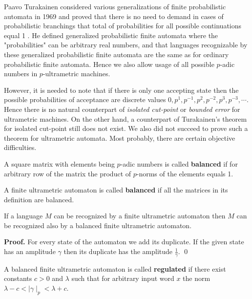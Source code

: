 \documentclass{llncs}
\begin{document}
Paavo Turakainen considered various generalizations of finite probabilistic automata in 1969 and proved that there is no need to demand in cases of probabilistic branchings that total of probabilities for all possible continuations equal 1 \cite{T69}. He defined generalized probabilistic finite automata where the "probabilities" can be arbitrary real numbers, and that languages recognizable by these generalized probabilistic finite automata are the same as for ordinary probabilistic finite automata. Hence we also allow usage of all possible $p$-adic numbers in $p$-ultrametric machines.

However, it is needed to note that if there is only one accepting state then the possible probabilities of acceptance are discrete values $0, p^1, p^{-1}, p^2, p^{-2}, p^3, p^{-3}, \cdots $. Hence there is no natural counterpart of {\em isolated cut-point} or {\em bounded error} for ultrametric machines. On the other hand, a counterpart of Turakainen's theorem for isolated cut-point still does not exist. We also did not succeed to prove such a theorem for ultrametric automata. Most probably, there are certain objective difficulties.



\begin{definition}
A square matrix with elements being $p$-adic numbers is called {\bf balanced} if for arbitrary row of the matrix the product of $p$-norms of the elements equals 1.
\end{definition}

\begin{definition}
A finite ultrametric automaton is called {\bf balanced} if all the matrices in its definition are balanced.
\end{definition}

\begin{theorem}
If a language $M$ can be recognized by a finite ultrametric automaton then $M$ can be recognized also by a balanced finite ultrametric automaton.
\end{theorem}

{\bf Proof.} For every state of the automaton we add its duplicate. If the given state has an amplitude $\gamma $ then its duplicate has the amplitude $\frac{1}{\gamma }$. \qed
 

\begin{definition}
A balanced finite ultrametric automaton is called {\bf regulated} if there exist constants $c > 0$ and $\lambda $ such that for arbitrary input word $x$ the norm 
$\lambda -c < \mid \gamma \mid _p < \lambda +c$. 
\end{definition}
\end{document}
